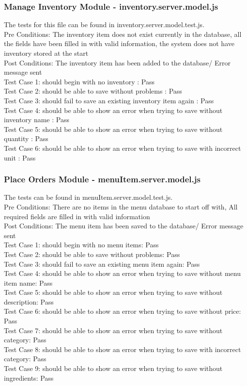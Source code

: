 \documentclass[a4paper,12pt]{report}
\begin{document}
 \subsubsection{Manage Inventory Module - inventory.server.model.js}
 The tests for this file can be found in inventory.server.model.test.js. \\
Pre Conditions: The inventory item does not exist currently in the database,
all the fields have been filled in with valid information, the system does not have inventory stored at the start \\
Post Conditions: The inventory item has been added to the database/  Error message sent\\
Test Case 1: should begin with no inventory : Pass\\
Test Case 2: should be able to save without problems : Pass\\
Test Case 3: should fail to save an existing inventory item again : Pass\\
Test Case 4: should be able to show an error when trying to save without inventory name : Pass\\
Test Case 5: should be able to show an error when trying to save without quantity : Pass\\
Test Case 6: should be able to show an error when trying to save with incorrect unit : Pass\\
 
  \subsubsection{Place Orders Module - menuItem.server.model.js}
 
The tests can be found in menuItem.server.model.test.js.\\
Pre Conditions: There are no items in the menu database to start off with, All required fields are filled in with valid information\\
Post Conditions: The menu item has been saved to the database/ Error message sent\\
Test Case 1: should begin with no menu items: Pass\\
Test Case 2: should be able to save without problems: Pass\\
Test Case 3: should fail to save an existing menu item again: Pass\\
Test Case 4: should be able to show an error when trying to save without menu item name: Pass\\
Test Case 5: should be able to show an error when trying to save without description: Pass\\
Test Case 6: should be able to show an error when trying to save without price: Pass\\
Test Case 7: should be able to show an error when trying to save without category: Pass\\
Test Case 8: should be able to show an error when trying to save with incorrect category: Pass\\
Test Case 9: should be able to show an error when trying to save without ingredients: Pass\\
\end{document}
